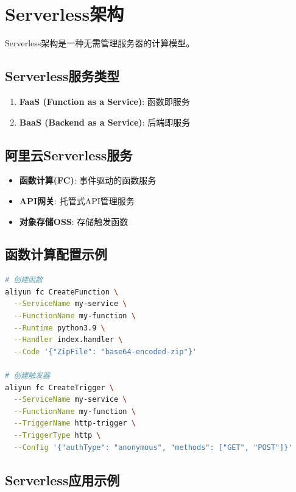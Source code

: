 \documentclass[12pt,UTF8]{ctexbook}
\begin{document}
\section{Serverless架构}
\label{sec:serverless}

Serverless架构是一种无需管理服务器的计算模型。

\subsection{Serverless服务类型}

\begin{enumerate}
    \item \textbf{FaaS (Function as a Service)}: 函数即服务
    \item \textbf{BaaS (Backend as a Service)}: 后端即服务
\end{enumerate}

\subsection{阿里云Serverless服务}

\begin{itemize}
    \item \textbf{函数计算(FC)}: 事件驱动的函数服务
    \item \textbf{API网关}: 托管式API管理服务
    \item \textbf{对象存储OSS}: 存储触发函数
\end{itemize}

\subsection{函数计算配置示例}

\begin{lstlisting}[language=bash]
# 创建函数
aliyun fc CreateFunction \
  --ServiceName my-service \
  --FunctionName my-function \
  --Runtime python3.9 \
  --Handler index.handler \
  --Code '{"ZipFile": "base64-encoded-zip"}'

# 创建触发器
aliyun fc CreateTrigger \
  --ServiceName my-service \
  --FunctionName my-function \
  --TriggerName http-trigger \
  --TriggerType http \
  --Config '{"authType": "anonymous", "methods": ["GET", "POST"]}'
\end{lstlisting}

\subsection{Serverless应用示例}
\end{document}
